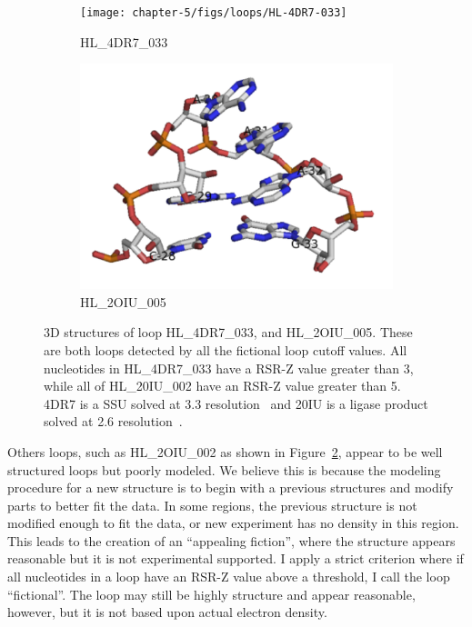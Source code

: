 \begin{figure}
  \begin{subfigure}[b]{0.45\textwidth}
    \texttt{[image: chapter-5/figs/loops/HL-4DR7-033]}
    \caption{HL\_4DR7\_033}
\label{fig:hl-4dr7-033}
  \end{subfigure}
  \begin{subfigure}[b]{0.45\textwidth}
    \includegraphics[width=\textwidth]{chapter-5/figs/loops/HL-2OIU-005}
    \caption{HL\_2OIU\_005}
\label{fig:hl-2oiu-002}
  \end{subfigure}
  \caption{3D structures of loop HL\_4DR7\_033, and HL\_2OIU\_005. These are
    both loops detected by all the fictional loop cutoff values. All nucleotides
    in HL\_4DR7\_033 have a RSR-Z value greater than 3, while all of HL\_20IU\_002
    have an RSR-Z value greater than 5. 4DR7 is a \TT{} SSU solved at
    3.3\angstrom{} resolution~\cite{Demirci2013} and 20IU is a ligase product
      solved at 2.6\angstrom{} resolution~\cite{Robertson2007}.}
\label{fig:fictional-loops}
\end{figure}

Others loops, such as HL\_2OIU\_002 as shown in Figure~\ref{fig:hl-2oiu-002},
appear to be well structured loops but poorly modeled. We believe this is
because the modeling procedure for a new structure is to begin with a previous
structures and modify parts to better fit the data. In some regions, the
previous structure is not modified enough to fit the data, or new experiment has
no density in this region. This leads to the creation of an ``appealing fiction'',
where the structure appears reasonable but it is not experimental supported. I 
apply a strict criterion where if all nucleotides in a loop have an RSR-Z value
above a threshold, I call the loop ``fictional''. The loop may still be highly
structure and appear reasonable, however, but it is not based upon actual
electron density.

